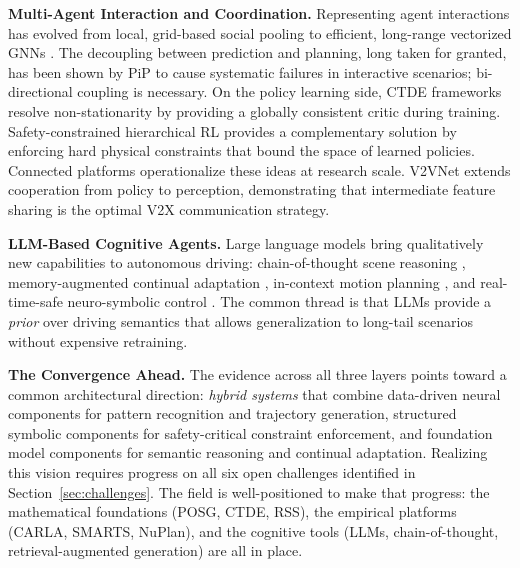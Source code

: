 \documentclass[12pt, a4paper]{article}
\begin{document}
\textbf{Multi-Agent Interaction and Coordination.}
Representing agent interactions has evolved from local, grid-based social pooling
\citep{alahi2016social} to efficient, long-range vectorized GNNs
\citep{gao2020vectornet}. The decoupling between prediction and planning, long
taken for granted, has been shown by PiP \citep{song2020pip} to cause systematic
failures in interactive scenarios; bi-directional coupling is necessary. On the
policy learning side, CTDE frameworks \citep{lowe2017multi} resolve non-stationarity
by providing a globally consistent critic during training. Safety-constrained
hierarchical RL \citep{shalev2016safe} provides a complementary solution by
enforcing hard physical constraints that bound the space of learned policies.
Connected platforms \citep{palanisamy2020multi, zhou2020smarts} operationalize
these ideas at research scale. V2VNet \citep{wang2020v2vnet} extends cooperation
from policy to perception, demonstrating that intermediate feature sharing is the
optimal V2X communication strategy.

\textbf{LLM-Based Cognitive Agents.}
Large language models bring qualitatively new capabilities to autonomous driving:
chain-of-thought scene reasoning \citep{fu2023drive}, memory-augmented continual
adaptation \citep{wen2023dilu}, in-context motion planning \citep{mao2023gpt},
and real-time-safe neuro-symbolic control \citep{sha2023languagempc}. The common
thread is that LLMs provide a \emph{prior} over driving semantics that allows
generalization to long-tail scenarios without expensive retraining.

\textbf{The Convergence Ahead.}
The evidence across all three layers points toward a common architectural
direction: \emph{hybrid systems} that combine data-driven neural components for
pattern recognition and trajectory generation, structured symbolic components for
safety-critical constraint enforcement, and foundation model components for
semantic reasoning and continual adaptation. Realizing this vision requires
progress on all six open challenges identified in Section~\ref{sec:challenges}.
The field is well-positioned to make that progress: the mathematical foundations
(POSG, CTDE, RSS), the empirical platforms (CARLA, SMARTS, NuPlan), and the
cognitive tools (LLMs, chain-of-thought, retrieval-augmented generation) are all
in place.



\end{document}
